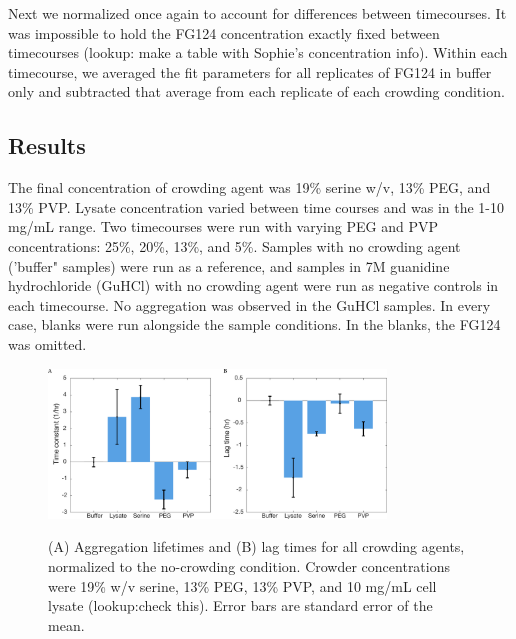 Next we normalized once again to account for differences between timecourses.  It was impossible to hold the FG124 concentration exactly fixed between timecourses (lookup: make a table with Sophie's concentration info).   Within each timecourse, we averaged the fit parameters for all replicates of FG124 in buffer only and subtracted that average from each replicate of each crowding condition.

\subsection{Results}

The final concentration of crowding agent was 19\% serine w/v, 13\% PEG, and 13\% PVP.  Lysate concentration varied between time courses and was in the 1-10 mg/mL range.  Two timecourses were run with varying PEG and PVP concentrations: 25\%, 20\%, 13\%, and 5\%.  Samples with no crowding agent ('buffer" samples) were run as a reference, and samples in 7M guanidine hydrochloride (GuHCl) with no crowding agent were run as negative controls in each timecourse.  No aggregation was observed in the GuHCl samples.  In every case, blanks were run alongside the sample conditions.  In the blanks, the FG124 was omitted.

\begin{figure}
\caption{(A) Aggregation lifetimes and (B) lag times for all crowding agents, normalized to the no-crowding condition.  Crowder concentrations were 19\% w/v serine, 13\% PEG, 13\% PVP, and 10 mg/mL cell lysate (lookup:check this).  Error bars are standard error of the mean.}
\centering
\includegraphics[width=0.8\textwidth]{figs/ch05/barCharts.pdf}
\label{fig:tht-all-conditions}
\end{figure}



